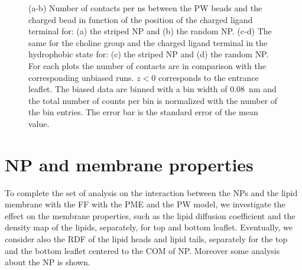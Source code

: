 \begin{figure}[h!]
{		}
		\caption{(a-b) Number of contacts per ns between the \acs{PW} beads and the charged bead in function of the position of the charged ligand terminal for: (a) the striped \acs{NP} and (b) the random \acs{NP}. (c-d) The same for the choline group and the charged ligand terminal in the hydrophobic state for: (c) the striped \ac{NP} and (d) the random \acs{NP}. For each plots the number of contacts are in comparison with the corresponding unbiased runs.  $z<0$ corresponds to the entrance leaflet. The biased data are binned with a bin width of $0.08$~nm and the total number of counts per bin is normalized with the number of the bin entries. The error bar is the standard error of the mean value.}%
		\label{fig:contactsUn}
\end{figure}

\newpage
\section{NP and membrane properties}
To complete the set of analysis on the interaction between the \acp{NP} and the lipid membrane with the \martini \ac{FF} with the \ac{PME} and the \ac{PW} model, we investigate the effect on the membrane properties, such as the lipid diffusion coefficient and the density map of the lipids, separately, for top and bottom leaflet. Eventually, we consider also the \ac{RDF} of the lipid heads and lipid tails, separately for the top and the bottom leaflet centered to the \ac{COM} of \ac{NP}. Moreover some analysis about the \ac{NP} is shown.

